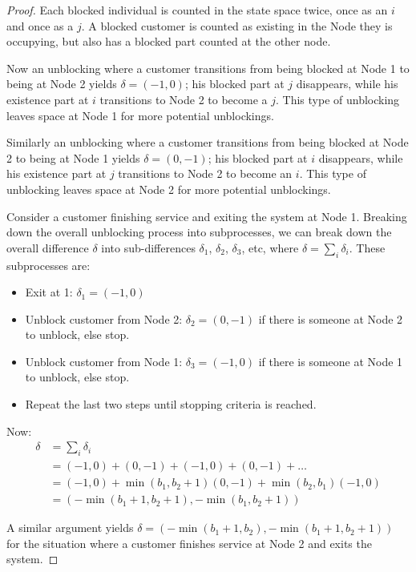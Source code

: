 \documentclass{article}
\begin{document}
\begin{proof}
  Each blocked individual is counted in the state space twice, once as an $i$ and once as a $j$. A blocked customer is counted as existing in the Node they is occupying, but also has a blocked part counted at the other node.

  Now an unblocking where a customer transitions from being blocked at Node 1 to being at Node 2 yields $\delta = (-1, 0)$; his blocked part at $j$ disappears, while his existence part at $i$ transitions to Node 2 to become a $j$.
  This type of unblocking leaves space at Node 1 for more potential unblockings.

  Similarly an unblocking where a customer transitions from being blocked at Node 2 to being at Node 1 yields $\delta = (0, -1)$; his blocked part at $i$ disappears, while his existence part at $j$ transitions to Node 2 to become an $i$.
  This type of unblocking leaves space at Node 2 for more potential unblockings.

  Consider a customer finishing service and exiting the system at Node 1.
  Breaking down the overall unblocking process into subprocesses, we can break down the overall difference $\delta$ into sub-differences $\delta_1$, $\delta_2$, $\delta_3$, etc, where $\delta = \sum_i \delta_i$.
  These subprocesses are:

  \begin{itemize}
    \item Exit at 1: $\delta_1 = (-1, 0)$
    \item Unblock customer from Node 2: $\delta_2 = (0, -1)$ if there is someone at Node 2 to unblock, else stop.
    \item Unblock customer from Node 1: $\delta_3 = (-1, 0)$ if there is someone at Node 1 to unblock, else stop.
    \item Repeat the last two steps until stopping criteria is reached.
  \end{itemize}

  Now:
  \begin{align*}
    \delta &= \sum_i \delta_i\\
    &= (-1, 0) + (0, -1) + (-1, 0) + (0, -1) + \dots\\
    &= (-1, 0) + \min(b_1, b_2+1)(0, -1) + \min(b_2, b_1)(-1, 0)\\
    &= (-\min(b_1+1, b_2+1), -\min(b_1, b_2+1))
  \end{align*}

  A similar argument yields $\delta = (-\min(b_1+1, b_2), -\min(b_1+1, b_2+1))$ for the situation where a customer finishes service at Node 2 and exits the system.

\end{proof}
\end{document}

